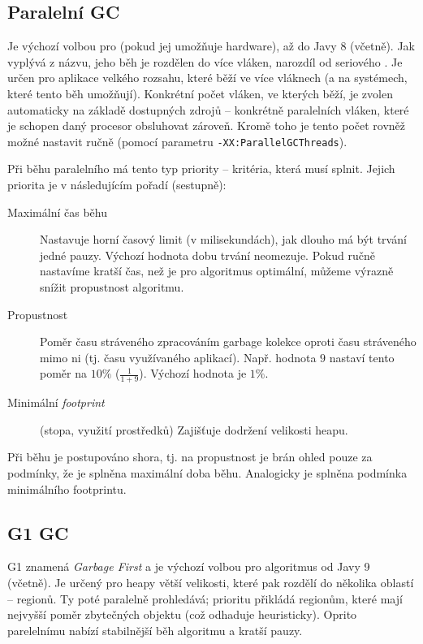 \subsection{Paralelní GC}
Je výchozí volbou pro  (pokud jej umožňuje hardware), až do Javy 8 (včetně). Jak vyplývá z názvu, jeho běh je rozdělen do více vláken, narozdíl od seriového . Je určen pro aplikace velkého rozsahu, které běží ve více vláknech (a na systémech, které tento běh umožňují). Konkrétní počet vláken, ve kterých  běží, je zvolen automaticky na základě dostupných zdrojů -- konkrétně paralelních vláken, které je schopen daný procesor obsluhovat zároveň. Kromě toho je tento počet rovněž možné nastavit ručně (pomocí parametru \texttt{-XX:ParallelGCThreads}). 

Při běhu paralelního  má tento typ priority -- kritéria, která musí splnit. Jejich priorita je v následujícím pořadí (sestupně):
\begin{description}
    \item[Maximální čas běhu] Nastavuje horní časový limit (v milisekundách), jak dlouho má být trvání jedné pauzy. Výchozí hodnota dobu trvání neomezuje. Pokud ručně nastavíme kratší čas, než je pro algoritmus optimální, můžeme výrazně snížit propustnost algoritmu.
    \item[Propustnost] Poměr času stráveného zpracováním garbage kolekce oproti času stráveného mimo ni (tj. času využívaného aplikací). Např. hodnota $9$ nastaví tento poměr na $10 \%$ ($\frac{1}{1+9}$). Výchozí hodnota je $1 \%$.
    \item[Minimální \textit{footprint}] (stopa, využití prostředků) Zajišťuje dodržení velikosti heapu.
\end{description}

Při běhu  je postupováno shora, tj. na propustnost je brán ohled pouze za podmínky, že je splněna maximální doba běhu. Analogicky je splněna podmínka minimálního footprintu.

\subsection{G1 GC}
G1 znamená \textit{Garbage First} a je výchozí volbou pro algoritmus od Javy 9 (včetně). Je určený pro heapy větší velikosti, které pak rozdělí do několika oblastí -- regionů. Ty poté paralelně prohledává; prioritu přikládá regionům, které mají nejvyšší poměr zbytečných objektu (což odhaduje heuristicky). Oprito parelelnímu  nabízí stabilnější běh algoritmu a kratší pauzy.


